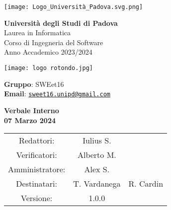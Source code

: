 \documentclass[a4paper, 11pt]{article}
\begin{document}
\begin{minipage}{0.35\linewidth}
    \texttt{[image: Logo\_Università\_Padova.svg.png]}
\end{minipage}\hfil
\begin{minipage}{0.55\linewidth}
\textbf{Università degli Studi di Padova} \\
Laurea in Informatica \\
Corso di Ingegneria del Software \\
Anno Accademico 2023/2024
\end{minipage}

\vspace{5mm}

\begin{minipage}{0.35\linewidth}
    \texttt{[image: logo rotondo.jpg]}
\end{minipage}\hfil
\begin{minipage}{0.55\linewidth}
\textbf{Gruppo}: SWEet16 \\
\textbf{Email}:
\href{mailto:sweet16.unipd@gmail.com}{\nolinkurl{sweet16.unipd@gmail.com}}
\end{minipage}

\vspace{15mm}

\begin{center}
\begin{Huge}
        \textbf{Verbale Interno} \\
        \vspace{4mm}
        \textbf{07 Marzo 2024}
\end{Huge}

\vspace{20mm}

\begin{large}
\begin{spacing}{1.4}
\begin{tabular}{c c c}
   Redattori: & Iulius S. & \\
   Verificatori: & Alberto M. & \\
   Amministratore: & Alex S. & \\
   Destinatari: & T. Vardanega & R. Cardin \\
   Versione: & 1.0.0 &
\end{tabular}
\end{spacing}
\end{large}
\end{center}

\pagebreak
\end{document}
